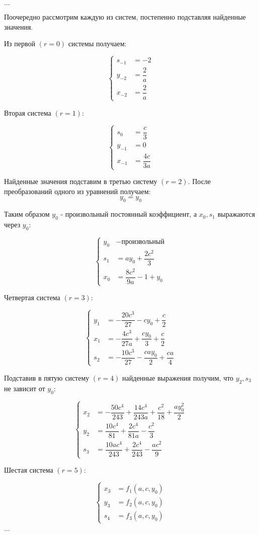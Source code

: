 \begin{center}
	$ \ldots $
\end{center}

\clearpage
						
Поочередно рассмотрим каждую из систем, постепенно подставляя найденные значения.

Из первой $ (r = 0) $ системы получаем:

$$
\left\{
	\begin{aligned}
		s_{-1} &= -2 \\
		y_{-2} &= \dfrac{2}{a} \\
		x_{-2} &= \dfrac{2}{a}
	\end{aligned}
\right.
$$

Вторая система $ (r = 1) $:

$$
\left\{
	\begin{aligned}
		s_{0} &= \dfrac{c}{3} \\
		y_{-1} &= 0 \\
		x_{-1} &= \dfrac{4c}{3a}
	\end{aligned}
\right.
$$

Найденные значения подставим в третью систему $ (r = 2) $. После преобразований одного из уравнений получаем:
$$ 
	y_0 = y_0
$$ 

Таким образом $ y_0 $ - произвольный постоянный коэффициент, а $ x_0, s_1 $ выражаются через $ y_0 $:

$$
\left\{
	\begin{aligned}
		y_{0} &- \text{произвольный} \\
		s_{1} &= ay_0 + \dfrac{2c^2}{3} \\
		x_{0} &= \dfrac{8c^2}{9a} - 1 + y_0
	\end{aligned}
\right.
$$

Четвертая система $ (r = 3) $:

$$
\left\{
	\begin{aligned}
		y_1 &= -\dfrac{20c^3}{27} - cy_0 + \dfrac{c}{2} \\
		x_1 &= -\dfrac{4c^3}{27a} + \dfrac{cy_0}{3} + \dfrac{c}{2} \\
		s_2 &= -\dfrac{10c^3}{27} - \dfrac{cay_0}{2} + \dfrac{ca}{4}
	\end{aligned}
\right.
$$

Подставив в пятую систему $ (r = 4) $ найденные выражения получим, что $ y_2,s_3 $ не зависит от $ y_0 $:

$$
\left\{
	\begin{aligned}
		x_2 &= -\dfrac{50c^4}{243} + \dfrac{14c^4}{243a} + \dfrac{c^2}{18} + \dfrac{ay^2_0}{2}\\
		y_2 &= \dfrac{10c^4}{81} + \dfrac{2c^4}{81a} - \dfrac{c^2}{3} \\
		s_3 &= \dfrac{10ac^4}{243} + \dfrac{2c^4}{243} - \dfrac{ac^2}{9}
	\end{aligned}
\right.
$$

Шестая система $ (r = 5) $:

$$
\left\{
	\begin{aligned}
		x_3 &= f_1(a,c,y_0) \\
		y_3 &= f_2(a,c,y_0) \\
		s_4 &= f_3(a,c,y_0)
	\end{aligned}
\right.
$$

\begin{center}
	$ \ldots $
\end{center}